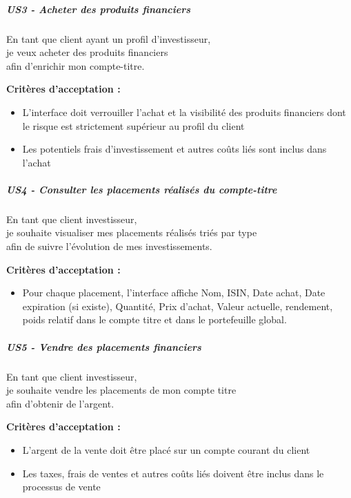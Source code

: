 \subparagraph{US3 - Acheter des produits
financiers}\label{us3---acheter-des-produits-financiers}

En tant que client ayant un profil d'investisseur,\\
je veux acheter des produits financiers\\
afin d'enrichir mon compte-titre.

\textbf{Critères d'acceptation :}

\begin{itemize}
\tightlist
\item
  L'interface doit verrouiller l'achat et la visibilité des produits
  financiers dont le risque est strictement supérieur au profil du
  client
\item
  Les potentiels frais d'investissement et autres coûts liés sont inclus
  dans l'achat
\end{itemize}

\subparagraph{US4 - Consulter les placements réalisés du
compte-titre}\label{us4---consulter-les-placements-ruxe9alisuxe9s-du-compte-titre}

En tant que client investisseur,\\
je souhaite visualiser mes placements réalisés triés par type\\
afin de suivre l'évolution de mes investissements.

\textbf{Critères d'acceptation :}

\begin{itemize}
\tightlist
\item
  Pour chaque placement, l'interface affiche Nom, ISIN, Date achat, Date
  expiration (si existe), Quantité, Prix d'achat, Valeur actuelle,
  rendement, poids relatif dans le compte titre et dans le portefeuille
  global.
\end{itemize}

\subparagraph{US5 - Vendre des placements
financiers}\label{us5---vendre-des-placements-financiers}

En tant que client investisseur,\\
je souhaite vendre les placements de mon compte titre\\
afin d'obtenir de l'argent.

\textbf{Critères d'acceptation :}

\begin{itemize}
\tightlist
\item
  L'argent de la vente doit être placé sur un compte courant du client
\item
  Les taxes, frais de ventes et autres coûts liés doivent être inclus
  dans le processus de vente
\end{itemize}


